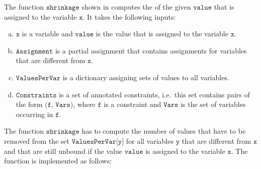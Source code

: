 The function $\texttt{shrinkage}$ shown in  computes
the  of the given $\texttt{value}$ that is assigned to the variable $\texttt{x}$.
It takes the following inputs:
\begin{enumerate}[(a)]
\item $\texttt{x}$ is a variable and $\texttt{value}$ is the value that is assigned to the variable $\texttt{x}$.
\item $\texttt{Assignment}$ is a partial assignment that contains assignments for variables that are
      different from $\texttt{x}$.
\item $\texttt{ValuesPerVar}$ is a dictionary assigning sets of values to all variables.
\item $\texttt{Constraints}$ is a set of annotated constraints, i.e.~this set contains pairs of the form 
      $\texttt{(f, Vars)}$, where $\texttt{f}$ is a constraint and $\texttt{Vars}$ is the set of
      variables occurring in $\texttt{f}$.
\end{enumerate}
The function $\texttt{shrinkage}$ has to compute the number of values that have to be removed from the set
$\texttt{ValuesPerVar[y]}$ for all variables $\texttt{y}$ that are different from $\texttt{x}$ and that are
still unbound if the value $\mathtt{value}$ is assigned to the variable $\texttt{x}$.  The function is
implemented as follows: 
